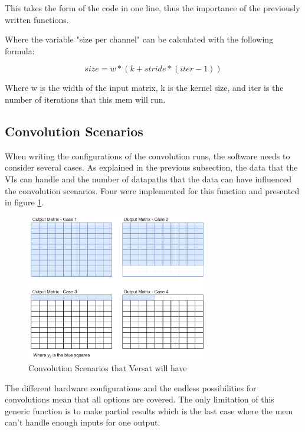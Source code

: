 This takes the form of the code in one line, thus the importance of the previously written functions.



Where the variable "size per channel" can be calculated with the following formula:

\[ size=w*(k+stride*(iter-1)) \]

Where w is the width of the input matrix, k is the kernel size, and iter is the number of iterations that this mem will run.

\subsection{Convolution Scenarios}
\label{ConvolutionScenarios}

When writing the configurations of the convolution runs, the software needs to consider several cases.
As explained in the previous subsection, the data that the VIs can handle and the number of datapaths that the data can have influenced
the convolution scenarios. Four were implemented for this function and presented in figure \ref{ConvScenarioss}.

\begin{figure}[!htbp]
    \centering
    \includegraphics[width=0.7\textwidth]{Figures/Variables.drawio.png}
    \caption{Convolution Scenarios that Versat will have}
    \label{ConvScenarioss}
\end{figure}

The different hardware configurations and the endless possibilities for convolutions mean that all options are covered. 
The only limitation of this generic function is to make partial results which is the last case where the mem can't handle enough inputs for one output.

